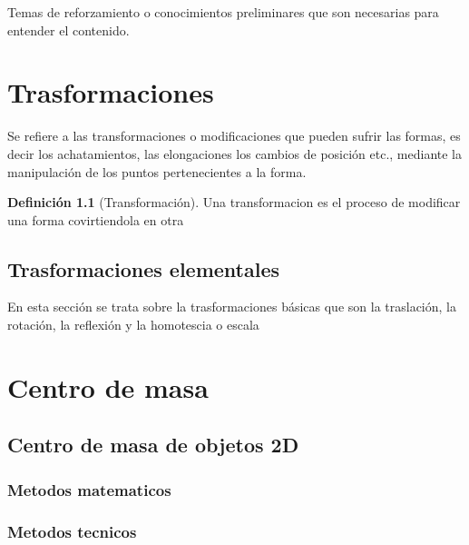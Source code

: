 \documentclass[16pt,]{krantz}
\theoremstyle{definition}
\newtheorem{definition}{Definición}[chapter]
\theoremstyle{definition}
\theoremstyle{definition}
\theoremstyle{definition}
\theoremstyle{remark}
\begin{document}
Temas de reforzamiento o conocimientos preliminares que son necesarias para entender el contenido.

\hypertarget{trasformaciones}{%
\chapter{Trasformaciones}\label{trasformaciones}}

Se refiere a las transformaciones o modificaciones que pueden sufrir las formas, es decir los achatamientos, las elongaciones los cambios de posición etc., mediante la manipulación de los puntos pertenecientes a la forma.

\begin{definition}[Transformación]
\protect\hypertarget{def:transformacion}{}{\label{def:transformacion} {} }Una transformacion es el proceso de modificar una forma covirtiendola en otra
\end{definition}

\hypertarget{trasformaciones-elementales}{%
\section{Trasformaciones elementales}\label{trasformaciones-elementales}}

En esta sección se trata sobre la trasformaciones básicas que son la traslación, la rotación, la reflexión y la homotescia o escala

\hypertarget{centro-de-masa}{%
\chapter{Centro de masa}\label{centro-de-masa}}

\hypertarget{centro-de-masa-de-objetos-2d}{%
\section{Centro de masa de objetos 2D}\label{centro-de-masa-de-objetos-2d}}

\hypertarget{metodos-matematicos}{%
\subsection{Metodos matematicos}\label{metodos-matematicos}}

\hypertarget{metodos-tecnicos}{%
\subsection{Metodos tecnicos}\label{metodos-tecnicos}}
\end{document}
